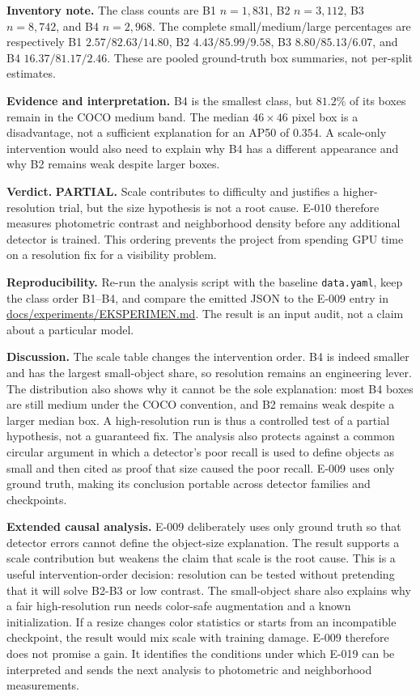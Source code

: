 \documentclass[preprint,12pt]{elsarticle}
\newcommand{\pathcode}[1]{\scriptsize\url{#1}}
\begin{document}
\textbf{Inventory note.} The class counts are B1 \(n=1{,}831\), B2
\(n=3{,}112\), B3 \(n=8{,}742\), and B4 \(n=2{,}968\). The complete
small/medium/large percentages are respectively B1 \(2.57/82.63/14.80\),
B2 \(4.43/85.99/9.58\), B3 \(8.80/85.13/6.07\), and B4
\(16.37/81.17/2.46\). These are pooled ground-truth box summaries, not
per-split estimates.

\textbf{Evidence and interpretation.} B4 is the smallest class, but
\(81.2\%\) of its boxes remain in the COCO medium band. The median \(46
\mathbin{\times}46\) pixel box is a disadvantage, not a sufficient
explanation for an AP50 of \(0.354\). A scale-only intervention would also
need to explain why B4 has a different appearance and why B2 remains weak
despite larger boxes.

\textbf{Verdict.} \textbf{PARTIAL.} Scale contributes to difficulty and
justifies a higher-resolution trial, but the size hypothesis is not a root
cause. E-010 therefore measures photometric contrast and neighborhood density
before any additional detector is trained. This ordering prevents the project
from spending GPU time on a resolution fix for a visibility problem.

\textbf{Reproducibility.} Re-run the analysis script with the baseline
\texttt{data.yaml}, keep the class order B1--B4, and compare the emitted JSON
to the E-009 entry in \pathcode{docs/experiments/EKSPERIMEN.md}. The result is
an input audit, not a claim about a particular model.

\textbf{Discussion.} The scale table changes the intervention order. B4 is
indeed smaller and has the largest small-object share, so resolution remains
an engineering lever. The distribution also shows why it cannot be the sole
explanation: most B4 boxes are still medium under the COCO convention, and
B2 remains weak despite a larger median box. A high-resolution run is thus a
controlled test of a partial hypothesis, not a guaranteed fix. The analysis
also protects against a common circular argument in which a detector's poor
recall is used to define objects as small and then cited as proof that size
caused the poor recall. E-009 uses only ground truth, making its conclusion
portable across detector families and checkpoints.

\textbf{Extended causal analysis.} E-009 deliberately uses only ground truth
so that detector errors cannot define the object-size explanation. The result
supports a scale contribution but weakens the claim that scale is the root
cause. This is a useful intervention-order decision: resolution can be tested
without pretending that it will solve B2-B3 or low contrast. The small-object
share also explains why a fair high-resolution run needs color-safe
augmentation and a known initialization. If a resize changes color statistics
or starts from an incompatible checkpoint, the result would mix scale with
training damage. E-009 therefore does not promise a gain. It identifies the
conditions under which E-019 can be interpreted and sends the next analysis to
photometric and neighborhood measurements.
\end{document}
